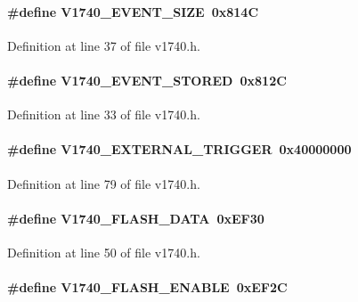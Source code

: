 \paragraph[{V1740\_\-EVENT\_\-SIZE}]{\setlength{\rightskip}{0pt plus 5cm}\#define V1740\_\-EVENT\_\-SIZE~0x814C}\hfill\label{v1740_8h_a1d33231cc6e2e12a998015f29fce2d9c}


Definition at line 37 of file v1740.h.
\paragraph[{V1740\_\-EVENT\_\-STORED}]{\setlength{\rightskip}{0pt plus 5cm}\#define V1740\_\-EVENT\_\-STORED~0x812C}\hfill\label{v1740_8h_a9b627ce3a731fde91b15b6cdae93aa07}


Definition at line 33 of file v1740.h.
\paragraph[{V1740\_\-EXTERNAL\_\-TRIGGER}]{\setlength{\rightskip}{0pt plus 5cm}\#define V1740\_\-EXTERNAL\_\-TRIGGER~0x40000000}\hfill\label{v1740_8h_a48e2ab8e73f02a5ff567a92d11402fe3}


Definition at line 79 of file v1740.h.
\paragraph[{V1740\_\-FLASH\_\-DATA}]{\setlength{\rightskip}{0pt plus 5cm}\#define V1740\_\-FLASH\_\-DATA~0xEF30}\hfill\label{v1740_8h_a409b4ee4ed7b91336505a64a615c2add}


Definition at line 50 of file v1740.h.
\paragraph[{V1740\_\-FLASH\_\-ENABLE}]{\setlength{\rightskip}{0pt plus 5cm}\#define V1740\_\-FLASH\_\-ENABLE~0xEF2C}\hfill\label{v1740_8h_a4e094b0446b91b617f135bec0d22bd7c}


